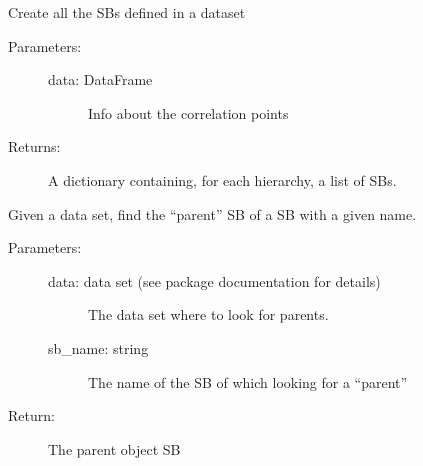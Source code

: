 \documentclass[letterpaper,10pt,english]{sphinxmanual}
\begin{document}

\begin{fulllineitems}
\label{\detokenize{hiegeo:hiegeo.create_sb_from_data}}
Create all the SBs defined in a dataset
\begin{description}
\item[{Parameters:}] \leavevmode\begin{description}
\item[{data: DataFrame}] \leavevmode
Info about the correlation points

\end{description}

\item[{Returns:}] \leavevmode
A dictionary containing, for each hierarchy, a list
of SBs.

\end{description}

\end{fulllineitems}


\begin{fulllineitems}
\label{\detokenize{hiegeo:hiegeo.get_SBparent_by_name}}
Given a data set, find the “parent” SB of a SB with a given name.
\begin{description}
\item[{Parameters:}] \leavevmode\begin{description}
\item[{data: data set (see package documentation for details)}] \leavevmode
The data set where to look for parents.

\item[{sb\_name: string}] \leavevmode
The name of the SB of which looking for a “parent”

\end{description}

\item[{Return:}] \leavevmode
The parent object SB

\end{description}

\end{fulllineitems}
\end{document}
